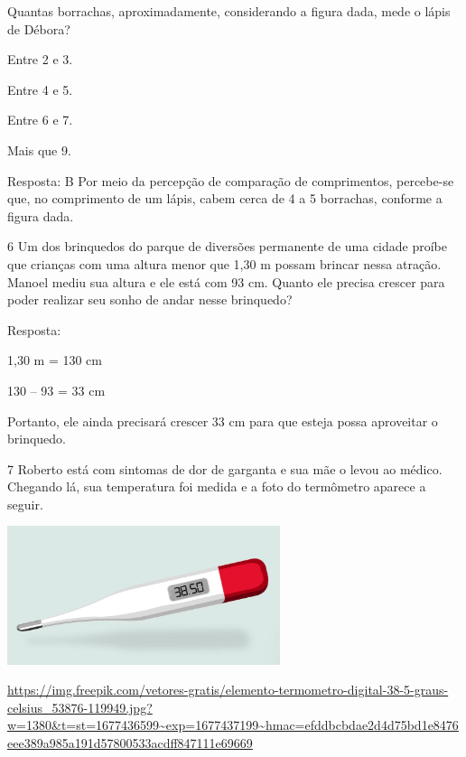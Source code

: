 \begin{escolha}

Quantas borrachas, aproximadamente, considerando a figura dada, mede o lápis de Débora?

\begin{escolha}
\item
  Entre 2 e 3.
\item
  Entre 4 e 5.
\item
  Entre 6 e 7.
\item
  Mais que 9.
\end{escolha}

Resposta: B
Por meio da percepção de comparação de comprimentos, percebe-se que, no
comprimento de um lápis, cabem cerca de 4 a 5 borrachas, conforme a figura dada.

\num{6} Um dos brinquedos do parque de diversões permanente de uma cidade proíbe
que crianças com uma altura menor que 1,30 m possam brincar nessa
atração. Manoel mediu sua altura e ele está com 93 cm. Quanto ele
precisa crescer para poder realizar seu sonho de andar nesse brinquedo?


Resposta:

1,30 m = 130 cm

130 -- 93 = 33 cm

Portanto, ele ainda precisará crescer 33 cm para que esteja possa aproveitar o brinquedo.

\num{7} Roberto está com sintomas de dor de garganta e sua mãe o levou ao
médico. Chegando lá, sua temperatura foi medida e a foto do termômetro
aparece a seguir.

\includegraphics[width=3.15000in,height=1.59426in]{media/image47.png}

\url{https://img.freepik.com/vetores-gratis/elemento-termometro-digital-38-5-graus-celsius_53876-119949.jpg?w=1380\&t=st=1677436599~exp=1677437199~hmac=efddbcbdae2d4d75bd1e8476eee389a985a191d57800533acdff847111e69669}


\end{escolha}

